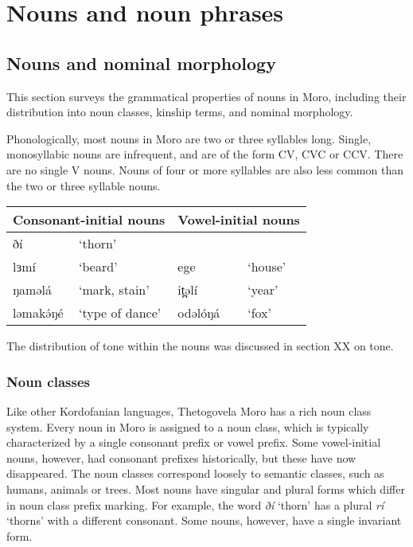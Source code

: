\part{Nouns and noun phrases}

\chapter{Nouns and nominal morphology}\label{chapter:nouns}

This section surveys the grammatical properties of nouns in Moro, including their distribution into noun classes, kinship terms, and nominal morphology. 

Phonologically, most nouns in Moro are two or three syllables long. Single, monosyllabic nouns are infrequent, and are of the form CV, CVC or CCV. There are no single V nouns. Nouns of four or more syllables are also less common than the two or three syllable nouns.

\ea 	\begin{tabular}[t]{llll}
  \multicolumn{2}{l}{Consonant-initial nouns} &   \multicolumn{2}{l}{Vowel-initial nouns} \\
\midrule
ðí	&	‘thorn’			&		&	 \\
lɜmí	&	‘beard’	&	ege		&	‘house’ \\
ŋaməlá	&	‘mark, stain’	&		it̪əlí	&	‘year’\\
ləmakə́ŋé	&	‘type of dance’	&	odəlóŋá	& ‘fox’ \\
			 	\end{tabular} \z


The distribution of tone within the nouns was discussed in section XX on tone. 

\section{Noun classes}

Like other Kordofanian languages, Thetogovela Moro has a rich noun class system. Every noun in Moro is assigned to a noun class, which is typically characterized by a single consonant prefix or vowel prefix. Some vowel-initial nouns, however, had consonant prefixes historically, but these have now disappeared. The noun classes correspond loosely to semantic classes, such as humans, animals or trees. Most nouns have singular and plural forms which differ in noun class prefix marking. For example, the word \textit{ðí} ‘thorn’ has a plural \textit{rí} ‘thorns’ with a different consonant. Some nouns, however, have a single invariant form.

